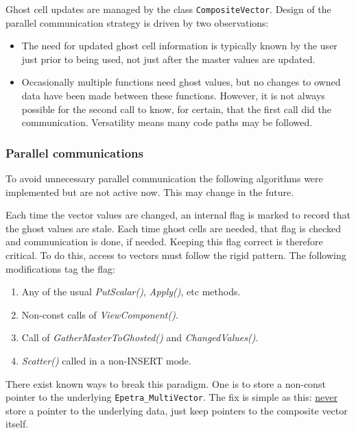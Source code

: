 Ghost cell updates are managed by the class {\tt CompositeVector}. 
Design of the parallel communication strategy is driven by two observations:
\begin{itemize}
\item The need for updated ghost cell information is typically known by the
      user just prior to being used, not just after the master values are
      updated.
\item Occasionally multiple functions need ghost values, but no changes to
      owned data have been made between these functions.  However, it is not
      always possible for the second call to know, for certain, that the first
      call did the communication.  Versatility means many code paths may be
      followed.
\end{itemize}


\subsubsection{Parallel communications}
To avoid unnecessary parallel communication the following algorithms were implemented
but are not active now.
This may change in the future.

Each time the vector values are changed, an internal flag is marked to
record that the ghost values are stale.
Each time ghost cells are needed, that flag is checked and communication
is done, if needed.
Keeping this flag correct is therefore critical. 
To do this, access to vectors must follow the rigid pattern.
The following modifications tag the flag:

\begin{enumerate}
\item Any of the usual {\it PutScalar()}, {\it Apply()}, etc methods.
\item Non-const calls of {\it ViewComponent()}.
\item Call of {\it GatherMasterToGhosted()} and {\it ChangedValues()}.
\item {\it Scatter()} called in a non-{\rm INSERT} mode.
\end{enumerate}

There exist known ways to break this paradigm. 
One is to store a non-const pointer to the underlying {\tt Epetra\_MultiVector}.
The fix is simple as this: \underline{never} store a pointer to the underlying data, 
just keep pointers to the composite vector itself.

